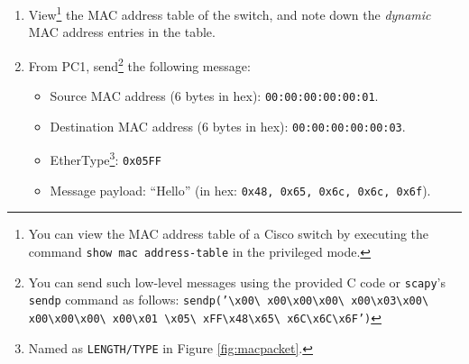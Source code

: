 \documentclass[pdftex,12pt,a4paper]{article}
\begin{document}
            \begin{enumerate}
                \item View\footnote{You can view the MAC address table of a
                Cisco switch by executing the command \texttt{show mac
                address-table} in the privileged mode.} the MAC address table of
                the switch, and note down the \emph{dynamic} MAC address
                entries in the table.

                \item From PC1, send\footnote{You can send such low-level
                messages using the provided C code or \texttt{scapy}'s
                \texttt{sendp} command as follows:
                \texttt{sendp('\textbackslash x00\textbackslash
                x00\textbackslash x00\textbackslash x00\textbackslash
                x00\textbackslash x03\textbackslash x00\textbackslash
                x00\textbackslash x00\textbackslash x00\textbackslash
                x00\textbackslash x01 \textbackslash x05\textbackslash
                xFF\textbackslash x48\textbackslash x65\textbackslash
                x6C\textbackslash x6C\textbackslash x6F')}} the following message: 
                    \begin{itemize}
                        \item Source MAC address (6 bytes in hex):
                        \texttt{00:00:00:00:00:01}.
                        \item Destination MAC address (6 bytes in hex):
                        \texttt{00:00:00:00:00:03}.
                        \item EtherType\footnote{Named as \texttt{LENGTH/TYPE} in
                        Figure \ref{fig:macpacket}.}: \texttt{0x05FF}
                        \item Message payload: ``Hello'' (in hex: \texttt{0x48,
                        0x65, 0x6c, 0x6c, 0x6f}).
                    \end{itemize}


\end{enumerate}
\end{document}

